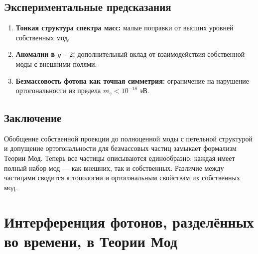 \documentclass[12pt,a4paper]{article}
\begin{document}
\subsection{Экспериментальные предсказания}
\begin{enumerate}[label=(\arabic*)]
    \item \textbf{Тонкая структура спектра масс:} малые поправки от высших уровней собственных мод.
    \item \textbf{Аномалии в $g-2$:} дополнительный вклад от взаимодействия собственной моды с внешними полями.
    \item \textbf{Безмассовость фотона как точная симметрия:} ограничение на нарушение ортогональности из предела $m_\gamma < 10^{-18}$ эВ.
\end{enumerate}

\subsection{Заключение}
Обобщение собственной проекции до полноценной моды с петельной структурой и допущение ортогональности для безмассовых частиц замыкает формализм Теории Мод. Теперь все частицы описываются единообразно: каждая имеет полный набор мод --- как внешних, так и собственных. Различие между частицами сводится к топологии и ортогональным свойствам их собственных мод.

\newpage
\section{Интерференция фотонов, разделённых во времени, в Теории Мод}

\begin{abstract}
Одним из самых поразительных явлений квантовой оптики является интерференция фотонов, испущенных в разное время. В стандартной квантовой механике это объясняется через формализм волновой функции, «растянутой во времени». Теория Мод предлагает принципиально иную, геометрическую интерпретацию: фотоны не имеют независимого существования как отдельные частицы, а являются сегментами единой фотонной моды на общей причинной петле. Время не является глобальным параметром, а индуцировано причинной последовательностью событий на этой петле. Безмассовость фотона позволяет его собственной моде иметь сколь угодно большую длину, охватывая макроскопические интервалы причинной последовательности. Предложены экспериментальные тесты, различающие стандартную и модовую интерпретацию.

\bigskip
\noindent\textbf{Ключевые слова:} интерференция фотонов, Теория Мод, причинная петля, собственная мода, безмассовость, топологическая корреляция.
\end{abstract}
\end{document}
